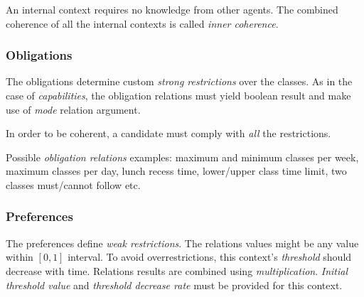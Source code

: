 \documentclass[../ThesisDoc]{subfiles}
\begin{document}
\providecommand{\rootdir}{..}


An internal context requires no knowledge from other agents.
The combined coherence of all the internal contexts is called
\emph{inner coherence}.

\subsubsection{Obligations}

The obligations determine custom \emph{strong restrictions} over the classes.
As in the case of \emph{capabilities}, the obligation relations must yield
boolean result and make use of \emph{mode} relation argument.

In order to be coherent, a candidate must comply with \emph{all} the restrictions.

\medskip

Possible \emph{obligation relations} examples:
maximum and minimum classes per week, maximum classes per day,
lunch recess time, lower/upper class time limit, two classes must/cannot follow etc.


\subsubsection{Preferences}

The preferences define \emph{weak restrictions}. The relations values might be any
value within $[0,1]$ interval. To avoid overrestrictions, this context's \emph{threshold}
should decrease with time. Relations results are combined using \emph{multiplication}.
\emph{Initial threshold value} and \emph{threshold decrease rate} must be
provided for this context.

\end{document}
